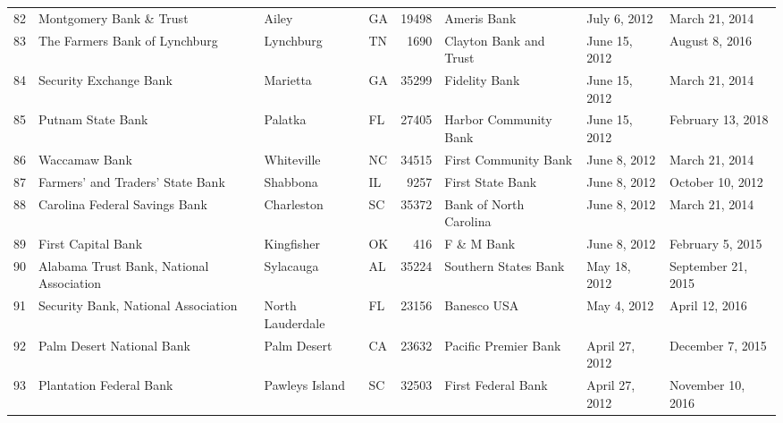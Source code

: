 \begin{tabular}{llllrlll}
82  &                            Montgomery Bank \& Trust &               Ailey &  GA &  19498 &                                        Ameris Bank &        July 6, 2012 &      March 21, 2014 \\
83  &                      The Farmers Bank of Lynchburg &           Lynchburg &  TN &   1690 &                             Clayton Bank and Trust &       June 15, 2012 &      August 8, 2016 \\
84  &                             Security Exchange Bank &            Marietta &  GA &  35299 &                                      Fidelity Bank &       June 15, 2012 &      March 21, 2014 \\
85  &                                  Putnam State Bank &             Palatka &  FL &  27405 &                              Harbor Community Bank &       June 15, 2012 &   February 13, 2018 \\
86  &                                      Waccamaw Bank &          Whiteville &  NC &  34515 &                               First Community Bank &        June 8, 2012 &      March 21, 2014 \\
87  &                   Farmers' and Traders' State Bank &            Shabbona &  IL &   9257 &                                   First State Bank &        June 8, 2012 &    October 10, 2012 \\
88  &                      Carolina Federal Savings Bank &          Charleston &  SC &  35372 &                             Bank of North Carolina &        June 8, 2012 &      March 21, 2014 \\
89  &                                 First Capital Bank &          Kingfisher &  OK &    416 &                                         F \& M Bank &        June 8, 2012 &    February 5, 2015 \\
90  &           Alabama Trust Bank, National Association &           Sylacauga &  AL &  35224 &                               Southern States Bank &        May 18, 2012 &  September 21, 2015 \\
91  &                Security Bank, National Association &    North Lauderdale &  FL &  23156 &                                        Banesco USA &         May 4, 2012 &      April 12, 2016 \\
92  &                          Palm Desert National Bank &         Palm Desert &  CA &  23632 &                               Pacific Premier Bank &      April 27, 2012 &    December 7, 2015 \\
93  &                            Plantation Federal Bank &      Pawleys Island &  SC &  32503 &                                 First Federal Bank &      April 27, 2012 &   November 10, 2016 \\

\end{tabular}
